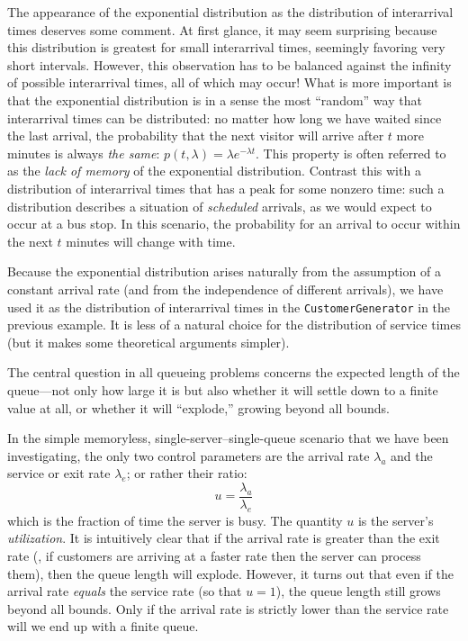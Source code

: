 The appearance of the exponential distribution as the distribution of
interarrival times deserves some comment. At first glance, it may seem
surprising because this distribution is greatest for small
interarrival times, seemingly favoring very short intervals. However,
this observation has to be balanced against the infinity of possible
interarrival times, all of which may occur! What is more important is
that the exponential distribution is in a sense the most ``random''
way that interarrival times can be distributed: no matter how long we
have waited since the last arrival, the probability that the next
visitor will arrive after $t$ more minutes is always \emph{the same}:
$p(t, \lambda) = \lambda e^{-\lambda t}$. This property is often
referred to as the \emph{lack of memory} of the exponential
distribution. Contrast this with a distribution of interarrival times
that has a peak for some nonzero time: such a distribution describes a
situation of \emph{scheduled} arrivals, as we would expect to occur at
a bus stop. In this scenario, the probability for an arrival to occur
within the next $t$ minutes will change with time.

Because the exponential distribution arises naturally from the
assumption of a constant arrival rate (and from the independence of
different arrivals), we have used it as the distribution of
interarrival times in the \texttt{CustomerGenerator} in the previous
example. It is less of a natural choice for the distribution of
service times (but it makes some theoretical arguments simpler).

The central question in all queueing problems concerns the expected
length of the queue---not only how large it is but also whether it
will settle down to a finite value at all, or whether it will
``explode,'' growing beyond all bounds.

In the simple memoryless, single-server--single-queue scenario that we
have been investigating, the only two control parameters are the
arrival rate $\lambda_a$ and the service or exit rate $\lambda_e$; or
rather their ratio:
%
\[
u = \frac{\lambda_a}{\lambda_e}
\]
%
which is the fraction of time the server is busy. The quantity $u$ is
the server's \emph{utilization}.  It is intuitively clear that if the
arrival rate is greater than the exit rate (\ie, if customers are
arriving at a faster rate then the server can process them), then the
queue length will explode. However, it turns out that even if the
arrival rate \emph{equals} the service rate (so that $u = 1$), the
queue length still grows beyond all bounds. Only if the arrival rate
is strictly lower than the service rate will we end up with a finite
queue.

